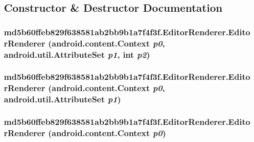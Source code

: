 \subsection{Constructor \& Destructor Documentation}
\hypertarget{classmd5b60ffeb829f638581ab2bb9b1a7f4f3f_1_1_editor_renderer_126a5ef185db22511cc66e9cafd0d310}{
\subsubsection[{EditorRenderer}]{\setlength{\rightskip}{0pt plus 5cm}md5b60ffeb829f638581ab2bb9b1a7f4f3f.EditorRenderer.EditorRenderer (android.content.Context {\em p0}, \/  android.util.AttributeSet {\em p1}, \/  int {\em p2})}}
\label{classmd5b60ffeb829f638581ab2bb9b1a7f4f3f_1_1_editor_renderer_126a5ef185db22511cc66e9cafd0d310}


\hypertarget{classmd5b60ffeb829f638581ab2bb9b1a7f4f3f_1_1_editor_renderer_ea191623f560a580a117cd8f184e59b3}{
\subsubsection[{EditorRenderer}]{\setlength{\rightskip}{0pt plus 5cm}md5b60ffeb829f638581ab2bb9b1a7f4f3f.EditorRenderer.EditorRenderer (android.content.Context {\em p0}, \/  android.util.AttributeSet {\em p1})}}
\label{classmd5b60ffeb829f638581ab2bb9b1a7f4f3f_1_1_editor_renderer_ea191623f560a580a117cd8f184e59b3}


\hypertarget{classmd5b60ffeb829f638581ab2bb9b1a7f4f3f_1_1_editor_renderer_2bc23540ae25cddc293e56ebaef99158}{
\subsubsection[{EditorRenderer}]{\setlength{\rightskip}{0pt plus 5cm}md5b60ffeb829f638581ab2bb9b1a7f4f3f.EditorRenderer.EditorRenderer (android.content.Context {\em p0})}}
\label{classmd5b60ffeb829f638581ab2bb9b1a7f4f3f_1_1_editor_renderer_2bc23540ae25cddc293e56ebaef99158}





